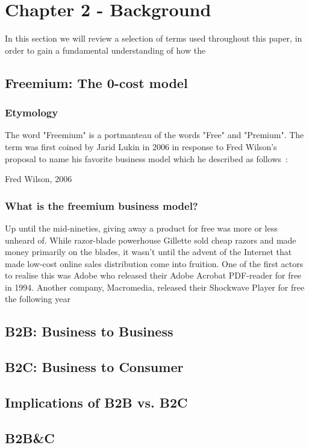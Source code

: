 \chapter{Chapter 2 - Background}
In this section we will review a selection of terms used throughout this paper, in order to gain a fundamental understanding of how the 
\section{Freemium: The 0-cost model}
\subsection {Etymology}
The word "Freemium" is a portmanteau of the words "Free" and "Premium". The term was first coined by Jarid Lukin in 2006 in response to Fred Wilson's proposal to name his favorite business model which he described as follows~\cite{freemiumdef}:
\begin{displayquote}
 Fred Wilson, 2006 \cite{barbarafindlayschenck2007}
\end{displayquote}
\subsection{What is the freemium business model?}
Up until the mid-nineties, giving away a product for free was more or less unheard of. While razor-blade powerhouse Gillette sold cheap razors and made money primarily on the blades, it wasn't until the advent of the Internet that made low-cost online sales distribution come into fruition. One of the first actors to realise this was Adobe who released their Adobe Acrobat PDF-reader for free in 1994. Another company, Macromedia, released their Shockwave Player for free the following year  
\section{B2B: Business to Business}
\section{B2C: Business to Consumer}
\section{Implications of B2B vs. B2C}
\section{B2B\&C}

